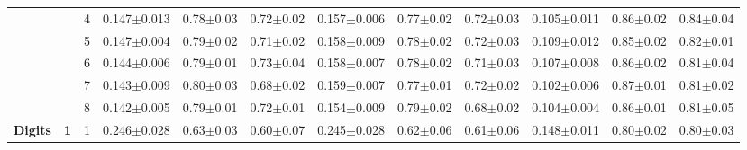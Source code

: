 \begin{table*}
{\begin{tabular}{|l|c|c||c|c|c||c|c|c||c|c|c|}
 & & 4 & \textcolor{gate_color}{0.147$\pm$0.013} & \textcolor{gate_color}{0.78$\pm$0.03} & \textcolor{gate_color}{0.72$\pm$0.02} & \textcolor{mixed_color}{0.157$\pm$0.006} & \textcolor{mixed_color}{0.77$\pm$0.02} & \textcolor{mixed_color}{0.72$\pm$0.03} & \textcolor{pulsed_color}{0.105$\pm$0.011} & \textcolor{pulsed_color}{0.86$\pm$0.02} & \textcolor{pulsed_color}{0.84$\pm$0.04} \\
 & & 5 & \textcolor{gate_color}{0.147$\pm$0.004} & \textcolor{gate_color}{0.79$\pm$0.02} & \textcolor{gate_color}{0.71$\pm$0.02} & \textcolor{mixed_color}{0.158$\pm$0.009} & \textcolor{mixed_color}{0.78$\pm$0.02} & \textcolor{mixed_color}{0.72$\pm$0.03} & \textcolor{pulsed_color}{0.109$\pm$0.012} & \textcolor{pulsed_color}{0.85$\pm$0.02} & \textcolor{pulsed_color}{0.82$\pm$0.01} \\
 & & 6 & \textcolor{gate_color}{0.144$\pm$0.006} & \textcolor{gate_color}{0.79$\pm$0.01} & \textcolor{gate_color}{0.73$\pm$0.04} & \textcolor{mixed_color}{0.158$\pm$0.007} & \textcolor{mixed_color}{0.78$\pm$0.02} & \textcolor{mixed_color}{0.71$\pm$0.03} & \textcolor{pulsed_color}{0.107$\pm$0.008} & \textcolor{pulsed_color}{0.86$\pm$0.02} & \textcolor{pulsed_color}{0.81$\pm$0.04} \\
 & & 7 & \textcolor{gate_color}{0.143$\pm$0.009} & \textcolor{gate_color}{0.80$\pm$0.03} & \textcolor{gate_color}{0.68$\pm$0.02} & \textcolor{mixed_color}{0.159$\pm$0.007} & \textcolor{mixed_color}{0.77$\pm$0.01} & \textcolor{mixed_color}{0.72$\pm$0.02} & \textcolor{pulsed_color}{0.102$\pm$0.006} & \textcolor{pulsed_color}{0.87$\pm$0.01} & \textcolor{pulsed_color}{0.81$\pm$0.02} \\
 & & 8 & \textcolor{gate_color}{0.142$\pm$0.005} & \textcolor{gate_color}{0.79$\pm$0.01} & \textcolor{gate_color}{0.72$\pm$0.01} & \textcolor{mixed_color}{0.154$\pm$0.009} & \textcolor{mixed_color}{0.79$\pm$0.02} & \textcolor{mixed_color}{0.68$\pm$0.02} & \textcolor{pulsed_color}{0.104$\pm$0.004} & \textcolor{pulsed_color}{0.86$\pm$0.01} & \textcolor{pulsed_color}{0.81$\pm$0.05} \\
\hline\hline
\multirow{12}{*}{\textbf{Digits}} & \multirow{8}{*}{\textbf{1}} & 1 & \textcolor{gate_color}{0.246$\pm$0.028} & \textcolor{gate_color}{0.63$\pm$0.03} & \textcolor{gate_color}{0.60$\pm$0.07} & \textcolor{mixed_color}{0.245$\pm$0.028} & \textcolor{mixed_color}{0.62$\pm$0.06} & \textcolor{mixed_color}{0.61$\pm$0.06} & \textcolor{pulsed_color}{0.148$\pm$0.011} & \textcolor{pulsed_color}{0.80$\pm$0.02} & \textcolor{pulsed_color}{0.80$\pm$0.03} \\

\end{tabular}}
\end{table*}
